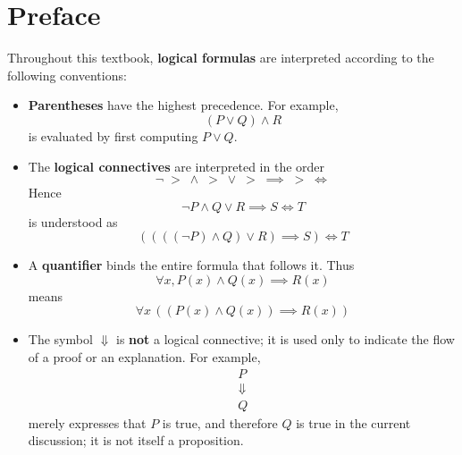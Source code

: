 \chapter{Preface}

Throughout this textbook, \textbf{logical formulas} are interpreted according to the following conventions:
\begin{itemize}
    \item \textbf{Parentheses} have the highest precedence. For example,
    \[
    (P \lor Q) \land R
    \]
    is evaluated by first computing $P \lor Q$.
    \item The \textbf{logical connectives} are interpreted in the order
    \[
    \neg \; > \; \land \; > \; \lor \; > \; \implies \; > \; \iff
    \]
    Hence
    \[
    \neg P \land Q \lor R \implies S \iff T
    \]
    is understood as
    \[
    ((((\neg P) \land Q) \lor R) \implies S) \iff T
    \]
    \item A \textbf{quantifier} binds the entire formula that follows it. Thus
    \[
    \forall x, P(x) \land Q(x) \implies R(x)
    \]
    means
    \[
    \forall x\, ((P(x)\land Q(x))\implies R(x))
    \]
    \item The symbol $\Downarrow$ is \textbf{not} a logical connective;
    it is used only to indicate the flow of a proof or an explanation. For example,
    \[
    \begin{array}{c}
        P \\
        \Downarrow \\
        Q
    \end{array}
    \]
    merely expresses that $P$ is true, and therefore $Q$ is true in the current discussion;
    it is not itself a proposition.
\end{itemize}
